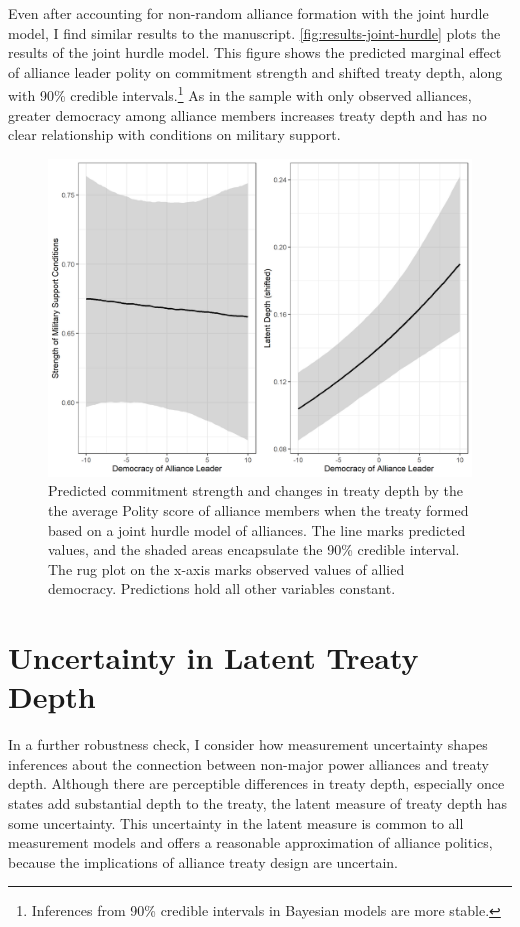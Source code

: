 \documentclass[12pt]{article}
\begin{document}
Even after accounting for non-random alliance formation with the joint hurdle model, I find similar results to the manuscript. 
\autoref{fig:results-joint-hurdle} plots the results of the joint hurdle model. 
This figure shows the predicted marginal effect of alliance leader polity on commitment strength and shifted treaty depth, along with 90\% credible intervals.\footnote{Inferences from 90\% credible intervals in Bayesian models are more stable.} 
As in the sample with only observed alliances, greater democracy among alliance members increases treaty depth and has no clear relationship with conditions on military support. 


\begin{figure}
\includegraphics[width=.95\textwidth]{results-joint-hurdle.png}  
\caption{Predicted commitment strength and changes in treaty depth by the the average Polity score of alliance members when the treaty formed based on a joint hurdle model of alliances. The line marks predicted values, and the shaded areas encapsulate the 90\% credible interval. The rug plot on the x-axis marks observed values of allied democracy. Predictions hold all other variables constant.}
\label{fig:results-joint-hurdle}
\end{figure}




\section{Uncertainty in Latent Treaty Depth} 


In a further robustness check, I consider how measurement uncertainty shapes inferences about the connection between non-major power alliances and treaty depth. 
Although there are perceptible differences in treaty depth, especially once states add substantial depth to the treaty, the latent measure of treaty depth has some uncertainty. 
This uncertainty in the latent measure is common to all measurement models and offers a reasonable approximation of alliance politics, because the implications of alliance treaty design are uncertain.  
\end{document}
